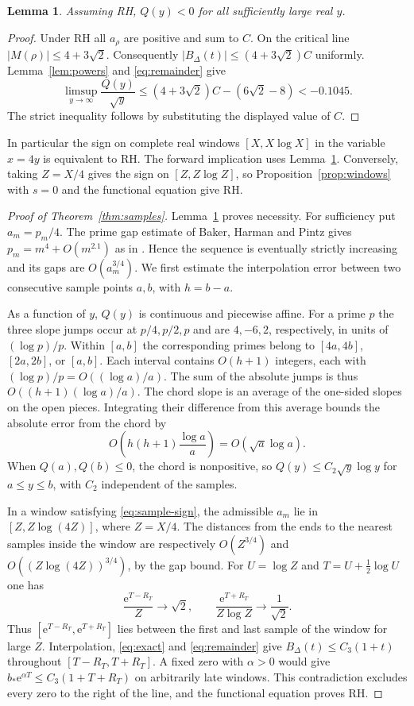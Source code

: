 \documentclass[11pt,a4paper]{article}
\newtheorem{lemma}[theorem]{Lemma}
\newcommand{\e}{\mathrm e}
\begin{document}
\begin{lemma}\label{lem:forward}
Assuming RH, \(Q(y)<0\) for all sufficiently large real \(y\).
\end{lemma}
\begin{proof}
Under RH all \(a_\rho\) are positive and sum to \(C\).
On the critical line \(|M(\rho)|\le4+3\sqrt2\). Consequently
\(|B_\Delta(t)|\le(4+3\sqrt2)C\) uniformly. Lemma~\ref{lem:powers}
and \eqref{eq:remainder} give
\[
 \limsup_{y\to\infty}\frac{Q(y)}{\sqrt y}
 \le (4+3\sqrt2)C-(6\sqrt2-8)<-0.1045 .
\]
The strict inequality follows by substituting the displayed value of \(C\).
\end{proof}

In particular the sign on complete real windows \([X,X\log X]\) in
the variable \(x=4y\) is equivalent to RH. The forward implication
uses Lemma~\ref{lem:forward}. Conversely, taking \(Z=X/4\) gives the
sign on \([Z,Z\log Z]\), so Proposition~\ref{prop:windows} with \(s=0\)
and the functional equation give RH.

\begin{proof}[Proof of Theorem~\ref{thm:samples}]
Lemma~\ref{lem:forward} proves necessity. For sufficiency put
\(a_m=p_m/4\). The prime gap estimate of Baker, Harman and Pintz
\cite{bhp} gives \(p_m=m^4+O(m^{2.1})\) as in \cite{cone}.
Hence the sequence is eventually strictly increasing and its gaps
are \(O(a_m^{3/4})\). We first estimate the interpolation error
between two consecutive sample points \(a,b\), with \(h=b-a\).

As a function of \(y\), \(Q(y)\) is continuous and piecewise affine.
For a prime \(p\) the three slope jumps occur at \(p/4,p/2,p\) and
are \(4,-6,2\), respectively, in units of \((\log p)/p\).
Within \([a,b]\) the corresponding primes belong to
\([4a,4b]\), \([2a,2b]\), or \([a,b]\). Each interval contains
\(O(h+1)\) integers, each with \((\log p)/p=O((\log a)/a)\).
The sum of the absolute jumps is thus \(O((h+1)(\log a)/a)\).
The chord slope is an average of the one-sided slopes on the open
pieces. Integrating their difference from this average bounds the
absolute error from the chord by
\[
 O\!\left(h(h+1)\frac{\log a}{a}\right)=O(\sqrt a\log a).
\]
When \(Q(a),Q(b)\le0\), the chord is nonpositive, so
\(Q(y)\le C_2\sqrt y\log y\) for \(a\le y\le b\), with \(C_2\)
independent of the samples.

In a window satisfying \eqref{eq:sample-sign}, the admissible \(a_m\)
lie in \([Z,Z\log(4Z)]\), where \(Z=X/4\). The distances from the
ends to the nearest samples inside the window are respectively
\(O(Z^{3/4})\) and \(O((Z\log(4Z))^{3/4})\), by the gap bound.
For \(U=\log Z\) and \(T=U+\frac12\log U\) one has
\[
 \frac{\e^{T-R_T}}{Z}\longrightarrow\sqrt2,\qquad
 \frac{\e^{T+R_T}}{Z\log Z}\longrightarrow\frac1{\sqrt2}.
\]
Thus \([\e^{T-R_T},\e^{T+R_T}]\) lies between the first and last
sample of the window for large \(Z\). Interpolation, \eqref{eq:exact}
and \eqref{eq:remainder} give \(B_\Delta(t)\le C_3(1+t)\) throughout
\([T-R_T,T+R_T]\). A fixed zero with \(\alpha>0\) would give
\(b_*\e^{\alpha T}\le C_3(1+T+R_T)\) on arbitrarily late windows.
This contradiction excludes every zero to the right of the line,
and the functional equation proves RH.
\end{proof}
\end{document}
